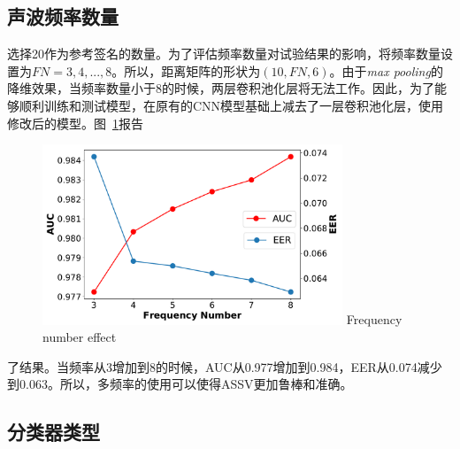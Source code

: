 \subsection{声波频率数量}
选择20作为参考签名的数量。为了评估频率数量对试验结果的影响，将频率数量设置为$FN=3, 4,..., 8$。所以，距离矩阵的形状为$(10, FN, 6)$。由于\textit{max pooling}的降维效果，当频率数量小于8的时候，两层卷积池化层将无法工作。因此，为了能够顺利训练和测试模型，在原有的CNN模型基础上减去了一层卷积池化层，使用修改后的模型。图~\ref{fig:frequency-number}报告
\begin{figure}[!htp]
  \centering
  \includegraphics[width=0.8\textwidth]{figure/multi_frequency_auc_eer.pdf}
      {Frequency number effect}
  \label{fig:frequency-number}
\end{figure}
了结果。当频率从3增加到8的时候，AUC从0.977增加到0.984，EER从0.074减少到0.063。所以，多频率的使用可以使得ASSV更加鲁棒和准确。

\subsection{分类器类型}

